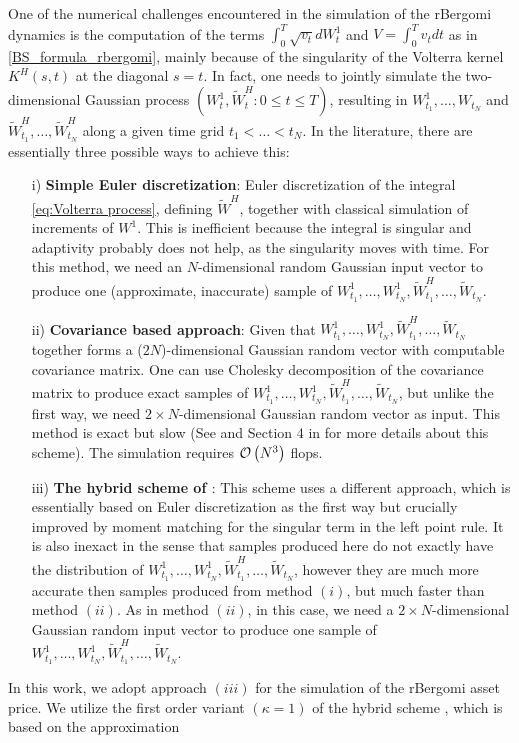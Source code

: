 One of the numerical challenges encountered in the simulation of the rBergomi dynamics  is the computation of the terms  $\int_{0}^{T} \sqrt{v_t} dW_t^1$ and $V=\int_{0}^{T} v_t dt$ as in \eqref{BS_formula_rbergomi}, mainly because of the singularity of the Volterra kernel $K^H(s,t)$ at the diagonal $s = t$. In fact,  one needs to jointly simulate the two-dimensional Gaussian process $(W_t^1, \widetilde{W}^H_t: 0 \le t \le T)$, resulting in $W^1_{t_1},\dots, W_{t_N}$ and $\widetilde{W}^H_{t_1},\dots, \widetilde{W}^H_{t_N}$ along a given time grid $t_1 <\dots < t_N$. In the literature, there are essentially three possible ways to achieve this:
 \begin{enumerate}
 	\item[i)] \textbf{Simple Euler discretization}: Euler discretization of the integral \eqref{eq:Volterra process}, defining $\widetilde{W}^H$, together with classical simulation of increments of $W^1$. This is inefficient because the integral is singular and adaptivity probably does not help, as the singularity moves with time. For this method, we need an $N$-dimensional random Gaussian input vector to produce one (approximate, inaccurate) sample of $W^1_{t_1},\dots, W^1_{t_N}, \widetilde{W}^H_{t_1},\dots, \widetilde{W}_{t_N}$.
 	
 	\item[ii)] \textbf{Covariance based approach}: Given that $W^1_{t_1},\dots, W^1_{t_N}, \widetilde{W}^H_{t_1},\dots, \widetilde{W}_{t_N}$ together forms a ($2N$)-dimensional Gaussian random vector with computable covariance matrix. One can use Cholesky decomposition of the covariance matrix to produce exact samples of $W^1_{t_1},\dots, W^1_{t_N}, \widetilde{W}^H_{t_1},\dots, \widetilde{W}_{t_N}$, but unlike the first way, we need $2 \times N$-dimensional Gaussian random vector as
 	input. This method is exact but slow (See  \cite{bayer2016pricing} and Section $4$ in \cite{bayer2017short} for more details about this scheme).   The simulation  requires ${\mathcal{O}}\left(N^3\right)$ flops. 
 	
 	\item[iii)]  \textbf{The hybrid scheme of \cite{bennedsen2017hybrid}}: This scheme uses a different approach, which is essentially based on  Euler discretization as the first way but crucially improved by moment
 	matching for the singular term in the left point rule. It is also
 	inexact in the sense that samples produced here do not exactly have the distribution of $W^1_{t_1},\dots, W^1_{t_N}, \widetilde{W}^H_{t_1},\dots, \widetilde{W}_{t_N}$, however they are much more accurate then samples produced from method $(i)$, but much faster than method $(ii)$. As in method $(ii)$, in this case, we need a $2 \times N$-dimensional Gaussian random input vector to produce one
 	sample of $W^1_{t_1},\dots, W^1_{t_N}, \widetilde{W}^H_{t_1},\dots, \widetilde{W}_{t_N}$.
 \end{enumerate}
In this work, we adopt approach  $(iii)$ for the simulation of the rBergomi asset price. We utilize the first order variant $(\kappa=1) $ of the hybrid scheme \cite{bennedsen2017hybrid}, which is based on the approximation

